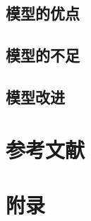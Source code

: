 \documentclass[UTF8]{ctexart}
\begin{document}
	\subsection{模型的优点}
	\subsection{模型的不足}
	\subsection{模型改进}
	
	\section{参考文献}
	
	\section{附录}
	\begin{appendices}
		
	\end{appendices}
	
\end{document}
